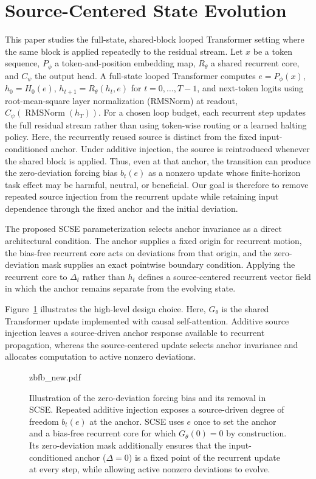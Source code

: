 \documentclass[letterpaper]{article} %
\newcommand{\SCSE}{\textsc{SCSE}}
\theoremstyle{remark}
\begin{document}
\section{Source-Centered State Evolution}
This paper studies the full-state, shared-block looped Transformer setting where the same block is applied repeatedly to the residual stream.  Let $x$ be a token sequence, $P_\phi$ a token-and-position embedding map, $R_\theta$ a shared recurrent core, and $C_\psi$ the output head.  A full-state looped Transformer computes $e=P_\phi(x)$, $h_0=H_0(e)$, $h_{t+1}=R_\theta(h_t,e)$ for $t=0,\ldots,T-1$, and next-token logits using root-mean-square layer normalization (RMSNorm) at readout, $C_\psi(\operatorname{RMSNorm}(h_T))$.  For a chosen loop budget, each recurrent step updates the full residual stream rather than using token-wise routing or a learned halting policy.  Here, the recurrently reused source is distinct from the fixed input-conditioned anchor.  Under additive injection, the source is reintroduced whenever the shared block is applied.  Thus, even at that anchor, the transition can produce the zero-deviation forcing bias $b_t(e)$ as a nonzero update whose finite-horizon task effect may be harmful, neutral, or beneficial.  Our goal is therefore to remove repeated source injection from the recurrent update while retaining input dependence through the fixed anchor and the initial deviation.

The proposed \SCSE{} parameterization selects anchor invariance as a direct architectural condition.  The anchor supplies a fixed origin for recurrent motion, the bias-free recurrent core acts on deviations from that origin, and the zero-deviation mask supplies an exact pointwise boundary condition.  Applying the recurrent core to $\Delta_t$ rather than $h_t$ defines a source-centered recurrent vector field in which the anchor remains separate from the evolving state.

Figure~\ref{fig:zdfb-intuition} illustrates the high-level design choice.  Here, $G_\theta$ is the shared Transformer update implemented with causal self-attention.  Additive source injection leaves a source-driven anchor response available to recurrent propagation, whereas the source-centered update selects anchor invariance and allocates computation to active nonzero deviations.

\begin{figure}[t!]
	\centering
	\begin{overpic}[width=0.96\textwidth]{zbfb_new.pdf}
	\end{overpic}
	\caption{Illustration of the zero-deviation forcing bias and its removal in \SCSE{}.  Repeated additive injection exposes a source-driven degree of freedom $b_t(e)$ at the anchor.  \SCSE{} uses $e$ once to set the anchor and a bias-free recurrent core for which $G_\theta(0)=0$ by construction.  Its zero-deviation mask additionally ensures that the input-conditioned anchor ($\Delta=0$) is a fixed point of the recurrent update at every step, while allowing active nonzero deviations to evolve.}
	\label{fig:zdfb-intuition}
\end{figure}
\end{document}
